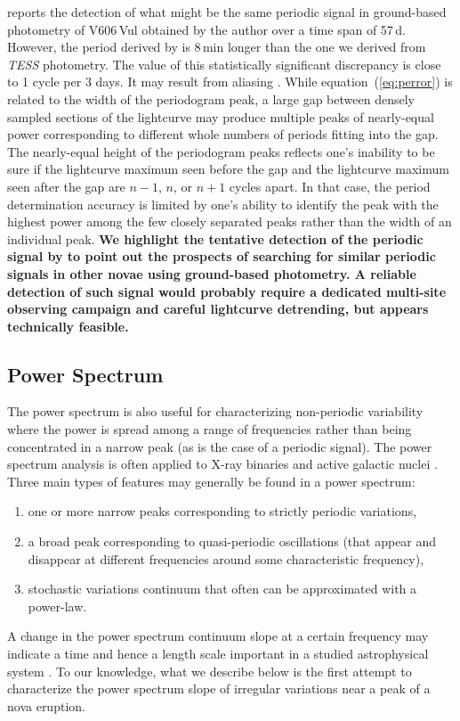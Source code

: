 \documentclass[twocolumn]{aastex631}
\newcommand{\nova}{V606\,Vul}
\begin{document}
\cite{2021JAVSO..49..261S} reports the detection of what might be the same
periodic signal in ground-based photometry of \nova{} obtained by the author
over a time span of 57\,d. 
However, the period derived by \cite{2021JAVSO..49..261S} is 8\,min longer
than the one we derived from {\em TESS} photometry. 
The value of this statistically significant discrepancy is close to 1 cycle per 
3 days. It may result from aliasing \citep[e.g.,][]{2018ApJS..236...16V}. 
While equation~(\ref{eq:perror}) is related to the width of the periodogram peak, 
a large gap between densely sampled sections of the lightcurve may produce 
multiple peaks of nearly-equal power corresponding to different whole numbers of periods fitting into the gap. 
The nearly-equal height of the periodogram peaks reflects one's inability to 
be sure if the lightcurve maximum seen before the gap and the lightcurve maximum seen after 
the gap are $n-1$, $n$, or $n+1$ cycles apart.
In that case, the period determination
accuracy is limited by one's ability to identify the peak with the highest
power among the few closely separated peaks rather than the width of an
individual peak. 
{\bf We highlight the tentative detection of the periodic signal by \cite{2021JAVSO..49..261S}
to point out the prospects of searching for similar periodic signals in other
novae using ground-based photometry. A reliable detection of such signal
would probably require a dedicated multi-site observing campaign and
careful lightcurve detrending, but appears technically feasible.}


\subsection{Power Spectrum}
\label{sec:psd}

The power spectrum is also useful for characterizing non-periodic
variability where the power is spread among a range of frequencies rather
than being concentrated in a narrow peak (as is the case of a periodic signal). 
The power spectrum analysis is often applied to X-ray binaries and active
galactic nuclei \citep[e.g.,][]{2003MNRAS.345.1271V,2012A&A...544A..80G,2018ApJ...857..141S}. 
Three main types of features may generally be found in a power spectrum:
\begin{enumerate} 
\item one or more narrow peaks corresponding to strictly periodic variations,
\item a broad peak corresponding to quasi-periodic oscillations (that appear
and disappear at different frequencies around some characteristic frequency),
\item stochastic variations continuum that often can be approximated with a
power-law.
\end{enumerate}
A change in the power spectrum continuum slope at a certain frequency may indicate 
a time and hence a length scale important in 
a studied astrophysical system
\citep{2009A&A...507.1211R,2015SciA....1E0686S,2019MNRAS.482.3622S,2021Sci...373..789B,2022MNRAS.515..571M}.
To our knowledge, what we describe below is the first attempt to
characterize the power spectrum slope of irregular variations near 
a peak of a nova eruption.
\end{document}
